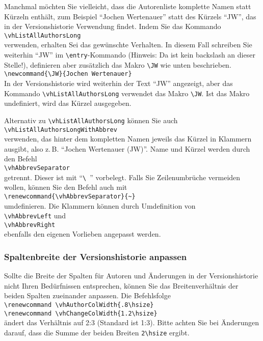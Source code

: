 Manchmal möchten Sie vielleicht, dass die Autorenliste komplette Namen statt Kürzeln enthält, zum Beispiel
"`Jochen Wer\-ten\-au\-er"' statt des Kürzels "`JW"', das in der Versionshistorie Verwendung findet. Indem Sie das Kommando\\
\mbox{}\hspace{2em}\verb|\vhListAllAuthorsLong|\\
verwenden, erhalten Sei das gewünschte Verhalten. In diesem Fall schreiben Sie weiterhin ``JW'' im \verb|\entry|-Kommando (Hinweis: Da ist kein backslash an dieser Stelle!), definieren aber zusätzlich das Makro \verb|\JW| wie unten beschrieben.\\
\mbox{}\hspace{2em}\verb|\newcommand{\JW}{Jochen Wertenauer}|\\
In der Versionshistorie wird weiterhin der Text "`JW"' angezeigt, aber das Kommando \verb|\vhListAllAuthorsLong| verwendet das Makro \verb|\JW|. Ist das Makro undefiniert, wird das Kürzel ausgegeben.

Alternativ zu \verb|\vhListAllAuthorsLong| können Sie auch\\
\mbox{}\hspace{2em}\verb|\vhListAllAuthorsLongWithAbbrev|\\
verwenden, das hinter dem kompletten Namen jeweils das Kürzel in Klammern ausgibt, also z.\,B. "`Jochen Wertenauer (JW)"'. Name und Kürzel werden durch den Befehl\\
\mbox{}\hspace{2em}\verb|\vhAbbrevSeparator|\\
getrennt. Dieser ist mit "`\verb*|\ |"' vorbelegt. Falls Sie Zeilenumbrüche vermeiden wollen, können Sie den Befehl auch mit\\
\mbox{}\hspace{2em}\verb|\renewcommand{\vhAbbrevSeparator}{~}|\\
umdefinieren. Die Klammern können durch Umdefinition von\\
\mbox{}\hspace{2em}\verb|\vhAbbrevLeft| und\\
\mbox{}\hspace{2em}\verb|\vhAbbrevRight|\\
ebenfalls den eigenen Vorlieben angepasst werden.

\subsubsection{Spaltenbreite der Versionshistorie anpassen}
Sollte die Breite der Spalten für Autoren und Änderungen in der Versionshistorie nicht Ihren Bedürfnissen entsprechen, können Sie das Breitenverhältnis der beiden Spalten zueinander anpassen. Die Befehlsfolge\\
\mbox{}\hspace{2em}\verb|\renewcommand \vhAuthorColWidth{.8\hsize}|\\
\mbox{}\hspace{2em}\verb|\renewcommand \vhChangeColWidth{1.2\hsize}|\\
ändert das Verhältnis auf 2:3 (Standard ist 1:3). Bitte achten Sie bei Änderungen darauf, dass die Summe der beiden Breiten \verb|2\hsize| ergibt.


